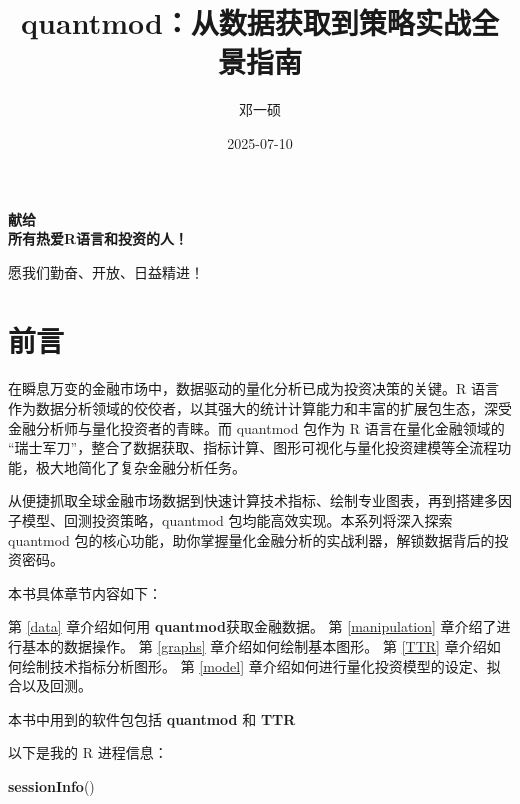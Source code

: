 \documentclass[]{ctexbook}
\title{quantmod：从数据获取到策略实战全景指南}
\author{邓一硕}
\date{2025-07-10}
\newenvironment{Shaded}{\begin{snugshade}}{\end{snugshade}}
\newcommand{\FunctionTok}[1]{\textcolor[rgb]{0.13,0.29,0.53}{\textbf{#1}}}
\newcommand{\NormalTok}[1]{#1}
\begin{document}
\maketitle

\thispagestyle{empty}

\begin{center}  %
     \Large\bfseries 献给\\[2cm]  %
    所有热爱R语言和投资的人！ %
    \par  %
    愿我们勤奋、开放、日益精进！ %
\end{center}

\setlength{\abovedisplayskip}{-5pt}
\setlength{\abovedisplayshortskip}{-5pt}

{
\setcounter{tocdepth}{2}
\tableofcontents
}
\listoftables
\listoffigures
\chapter*{前言}\label{ux524dux8a00}


在瞬息万变的金融市场中，数据驱动的量化分析已成为投资决策的关键。R 语言作为数据分析领域的佼佼者，以其强大的统计计算能力和丰富的扩展包生态，深受金融分析师与量化投资者的青睐。而 quantmod 包作为 R 语言在量化金融领域的 ``瑞士军刀''，整合了数据获取、指标计算、图形可视化与量化投资建模等全流程功能，极大地简化了复杂金融分析任务。

从便捷抓取全球金融市场数据到快速计算技术指标、绘制专业图表，再到搭建多因子模型、回测投资策略，quantmod 包均能高效实现。本系列将深入探索 quantmod 包的核心功能，助你掌握量化金融分析的实战利器，解锁数据背后的投资密码。

本书具体章节内容如下：

第 \ref{data} 章介绍如何用 \textbf{quantmod}\citep{quantmod}获取金融数据。 第 \ref{manipulation} 章介绍了进行基本的数据操作。 第 \ref{graphs} 章介绍如何绘制基本图形。 第 \ref{TTR} 章介绍如何绘制技术指标分析图形。 第 \ref{model} 章介绍如何进行量化投资模型的设定、拟合以及回测。

本书中用到的软件包包括 \textbf{quantmod}\citep{quantmod} 和 \textbf{TTR}\citep{TTR}

以下是我的 R 进程信息：

\begin{Shaded}
\begin{Highlighting}[]
\FunctionTok{sessionInfo}\NormalTok{()}
\end{Highlighting}
\end{Shaded}
\end{document}

